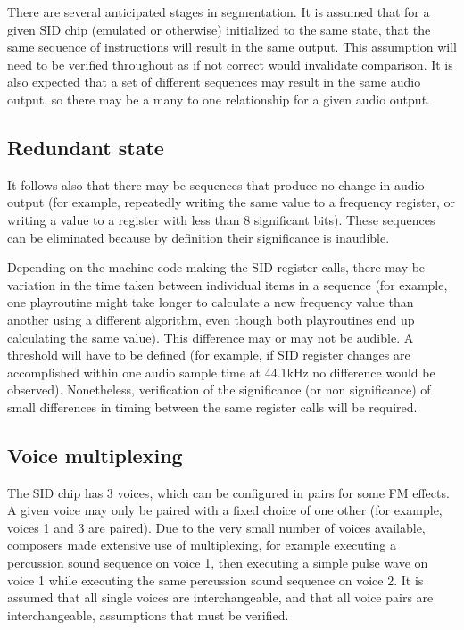 \documentclass[10pt]{article}
\begin{document}
\begin{multicols*}{2}
There are several anticipated stages in segmentation. It is assumed that for a given SID chip (emulated or otherwise) initialized to the same state, that the same sequence of instructions will result in the same output. This assumption will need to be verified throughout as if not correct would invalidate comparison. It is also expected that a set of different sequences may result in the same audio output, so there may be a many to one relationship for a given audio output.

\subsection{Redundant state}

It follows also that there may be sequences that produce no change in audio output (for example, repeatedly writing the same value to a frequency register, or writing a value to a register with less than 8 significant bits). These sequences can be eliminated because by definition their significance is inaudible.

Depending on the machine code making the SID register calls, there may be variation in the time taken between individual items in a sequence (for example, one playroutine might take longer to calculate a new frequency value than another using a different algorithm, even though both playroutines end up calculating the same value). This difference may or may not be audible. A threshold will have to be defined (for example, if SID register changes are accomplished within one audio sample time at 44.1kHz no difference would be observed). Nonetheless, verification of the significance (or non significance) of small differences in timing between the same register calls will be required.

\subsection{Voice multiplexing}

The SID chip has 3 voices, which can be configured in pairs for some FM effects. A given voice may only be paired with a fixed choice of one other (for example, voices 1 and 3 are paired). Due to the very small number of voices available, composers made extensive use of multiplexing, for example executing a percussion sound sequence on voice 1, then executing a simple pulse wave on voice 1 while executing the same percussion sound sequence on voice 2. It is assumed that all single voices are interchangeable, and that all voice pairs are interchangeable, assumptions that must be verified.


\end{multicols*}
\end{document}
